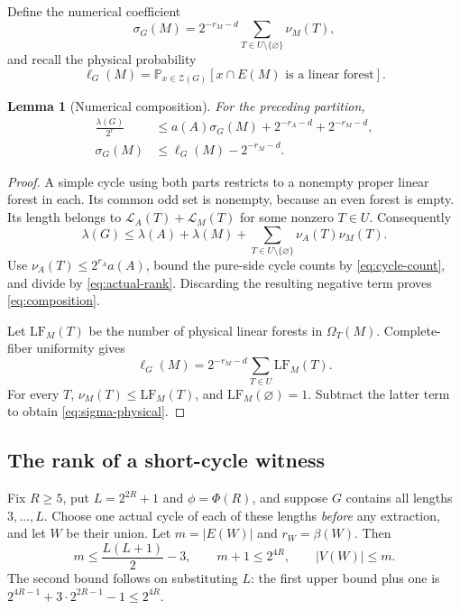 \documentclass[11pt,a4paper]{article}
\numberwithin{equation}{section}
\newtheorem{lemma}[theorem]{Lemma}
\theoremstyle{definition}
\theoremstyle{remark}
\newcommand{\cZ}{\mathcal Z}
\newcommand{\Om}{\Omega}
\newcommand{\Prob}{\mathbb P}
\begin{document}
Define the numerical coefficient
\begin{equation}\label{eq:sigma}
 \sigma_G(M)=2^{-r_M-d}\sum_{T\in U\setminus\{\varnothing\}}\nu_M(T),
\end{equation}
and recall the physical probability
\[
 \ell_G(M)=\Prob_{x\in\cZ(G)}[x\cap E(M)\text{ is a linear forest}].
\]

\begin{lemma}[Numerical composition]\label{lem:composition}
For the preceding partition,
\begin{align}
 \frac{\lambda(G)}{2^r}
 &\le a(A)\sigma_G(M)+2^{-r_A-d}+2^{-r_M-d},\label{eq:composition}\\
 \sigma_G(M)&\le\ell_G(M)-2^{-r_M-d}.\label{eq:sigma-physical}
\end{align}
\end{lemma}
\begin{proof}
A simple cycle using both parts restricts to a nonempty proper linear forest in each. Its common odd set is nonempty, because an even forest is empty. Its length belongs to
$\mathcal L_A(T)+\mathcal L_M(T)$ for some nonzero $T\in U$. Consequently
\[
 \lambda(G)\le\lambda(A)+\lambda(M)+
       \sum_{T\in U\setminus\{\varnothing\}}\nu_A(T)\nu_M(T).
\]
Use $\nu_A(T)\le2^{r_A}a(A)$, bound the pure-side cycle counts by \eqref{eq:cycle-count}, and divide by \eqref{eq:actual-rank}. Discarding the resulting negative term proves \eqref{eq:composition}.

Let $\mathrm{LF}_M(T)$ be the number of physical linear forests in $\Om_T(M)$. Complete-fiber uniformity gives
\[
 \ell_G(M)=2^{-r_M-d}\sum_{T\in U}\mathrm{LF}_M(T).
\]
For every $T$, $\nu_M(T)\le\mathrm{LF}_M(T)$, and $\mathrm{LF}_M(\varnothing)=1$. Subtract the latter term to obtain \eqref{eq:sigma-physical}.
\end{proof}

\subsection{The rank of a short-cycle witness}
Fix $R\ge5$, put $L=2^{2R}+1$ and $\phi=\Phi(R)$, and suppose $G$ contains all lengths $3,\ldots,L$. Choose one actual cycle of each of these lengths \emph{before} any extraction, and let $W$ be their union. Let $m=|E(W)|$ and $r_W=\beta(W)$. Then
\begin{equation}\label{eq:witness-size}
 m\le\frac{L(L+1)}2-3,\qquad m+1\le2^{4R},\qquad |V(W)|\le m.
\end{equation}
The second bound follows on substituting $L$: the first upper bound plus one is
$2^{4R-1}+3\cdot2^{2R-1}-1\le2^{4R}$.
\end{document}
